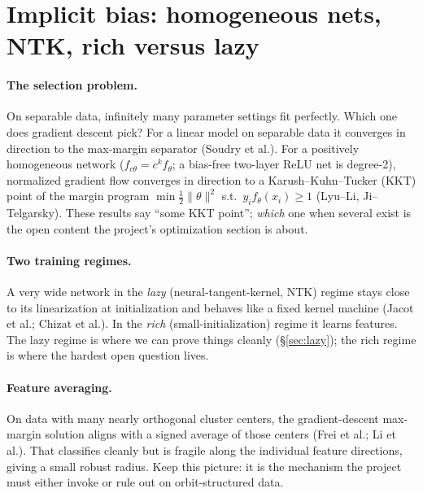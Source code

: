 \documentclass[11pt]{article}
\theoremstyle{plain}
\theoremstyle{definition}
\theoremstyle{remark}
\begin{document}
\section{Implicit bias: homogeneous nets, NTK, rich versus lazy}\label{sec:bias}

\paragraph{The selection problem.} On separable data, infinitely many parameter settings fit perfectly. Which one
does gradient descent pick? For a linear model on separable data it converges in direction to the max-margin
separator (Soudry et al.). For a positively homogeneous network ($f_{c\theta}=c^k f_\theta$; a bias-free two-layer
ReLU net is degree-2), normalized gradient flow converges in direction to a Karush--Kuhn--Tucker (KKT) point of the
margin program $\min\tfrac12\|\theta\|^2$ s.t.\ $y_if_\theta(x_i)\ge1$ (Lyu--Li, Ji--Telgarsky). These results say
``some KKT point''; \emph{which} one when several exist is the open content the project's optimization section is about.

\paragraph{Two training regimes.} A very wide network in the \emph{lazy} (neural-tangent-kernel, NTK) regime stays
close to its linearization at initialization and behaves like a fixed kernel machine (Jacot et al.; Chizat et al.).
In the \emph{rich} (small-initialization) regime it learns features. The lazy regime is where we can prove things
cleanly (\S\ref{sec:lazy}); the rich regime is where the hardest open question lives.

\paragraph{Feature averaging.} On data with many nearly orthogonal cluster centers, the gradient-descent max-margin
solution aligns with a signed average of those centers (Frei et al.; Li et al.). That classifies cleanly but is
fragile along the individual feature directions, giving a small robust radius. Keep this picture: it is the
mechanism the project must either invoke or rule out on orbit-structured data.
\end{document}
